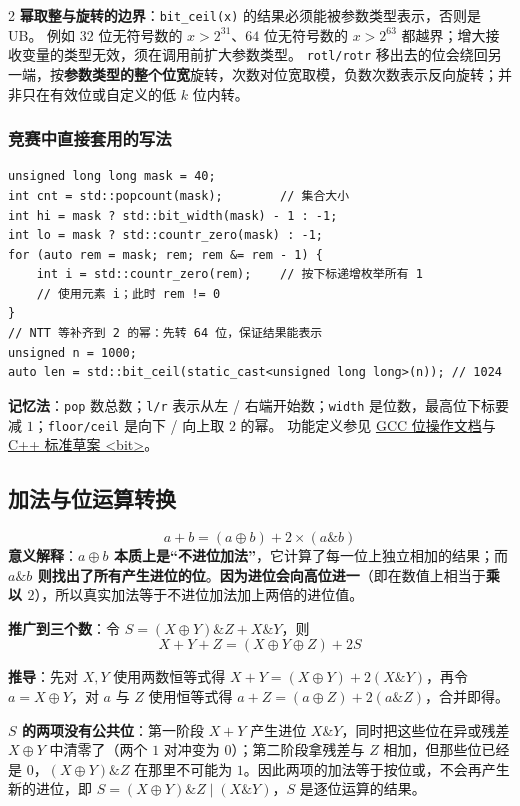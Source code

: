 \begin{multicols*}{2}
\textbf{幂取整与旋转的边界}：\texttt{bit\_ceil(x)} 的结果必须能被参数类型表示，否则是 UB。
例如 $32$ 位无符号数的 $x>2^{31}$、$64$ 位无符号数的 $x>2^{63}$ 都越界；增大接收变量的类型无效，须在调用前扩大参数类型。
\texttt{rotl/rotr} 移出去的位会绕回另一端，按\textbf{参数类型的整个位宽}旋转，次数对位宽取模，负数次数表示反向旋转；并非只在有效位或自定义的低 $k$ 位内转。

\subsubsection{竞赛中直接套用的写法}
\begin{verbatim}
unsigned long long mask = 40;
int cnt = std::popcount(mask);        // 集合大小
int hi = mask ? std::bit_width(mask) - 1 : -1;
int lo = mask ? std::countr_zero(mask) : -1;
for (auto rem = mask; rem; rem &= rem - 1) {
    int i = std::countr_zero(rem);    // 按下标递增枚举所有 1
    // 使用元素 i；此时 rem != 0
}
// NTT 等补齐到 2 的幂：先转 64 位，保证结果能表示
unsigned n = 1000;
auto len = std::bit_ceil(static_cast<unsigned long long>(n)); // 1024
\end{verbatim}

\textbf{记忆法}：\texttt{pop} 数总数；\texttt{l/r} 表示从左 / 右端开始数；\texttt{width} 是位数，最高位下标要减 $1$；\texttt{floor/ceil} 是向下 / 向上取 $2$ 的幂。
功能定义参见 \href{https://gcc.gnu.org/onlinedocs/gcc/Bit-Operation-Builtins.html}{GCC 位操作文档}与 \href{https://eel.is/c++draft/bit}{C++ 标准草案 <bit>}。

		\subsection{加法与位运算转换}
		$$a + b = (a \oplus b) + 2 \times (a \mathbin{\&} b)$$
		\textbf{意义解释}：\textbf{$a \oplus b$ 本质上是“不进位加法”}，它计算了每一位上独立相加的结果；而 \textbf{$a \mathbin{\&} b$ 则找出了所有产生进位的位}。\textbf{因为进位会向高位进一}（即在数值上相当于\textbf{乘以 $2$}），所以真实加法等于不进位加法加上两倍的进位值。

		\textbf{推广到三个数}：令 $S = (X \oplus Y) \mathbin{\&} Z + X \mathbin{\&} Y$，则
		$$X + Y + Z = (X \oplus Y \oplus Z) + 2S$$

		\textbf{推导}：先对 $X, Y$ 使用两数恒等式得 $X + Y = (X \oplus Y) + 2(X \mathbin{\&} Y)$，再令 $a = X \oplus Y$，对 $a$ 与 $Z$ 使用恒等式得 $a + Z = (a \oplus Z) + 2(a \mathbin{\&} Z)$，合并即得。

		\textbf{$S$ 的两项没有公共位}：第一阶段 $X + Y$ 产生进位 $X \mathbin{\&} Y$，同时把这些位在异或残差 $X \oplus Y$ 中清零了（两个 $1$ 对冲变为 $0$）；第二阶段拿残差与 $Z$ 相加，但那些位已经是 $0$，$(X \oplus Y) \mathbin{\&} Z$ 在那里不可能为 $1$。因此两项的加法等于按位或，不会再产生新的进位，即 $S = (X \oplus Y) \mathbin{\&} Z \mathbin{|} (X \mathbin{\&} Y)$，$S$ 是逐位运算的结果。


\end{multicols*}
